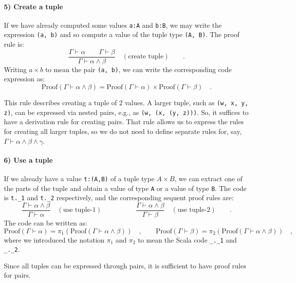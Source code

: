 \paragraph{5) Create a tuple}

If we have already computed some values \lstinline!a:A! and \lstinline!b:B!,
we may write the expression \lstinline!(a, b)! and so compute a value
of the tuple type \lstinline!(A, B)!. The proof rule is:
\[
\frac{\Gamma\vdash\alpha\quad\quad\Gamma\vdash\beta}{\Gamma\vdash\alpha\wedge\beta}\quad(\text{create tuple})\quad\quad.
\]
Writing $a\times b$ to mean the pair \lstinline!(a, b)!, we can
write the corresponding code expression as:
\[
\text{Proof}\left(\Gamma\vdash\alpha\wedge\beta\right)=\text{Proof}\left(\Gamma\vdash\alpha\right)\times\text{Proof}\left(\Gamma\vdash\beta\right)\quad.
\]

This rule describes creating a tuple of $2$ values. A larger tuple,
such as \lstinline!(w, x, y, z)!, can be expressed via nested pairs,
e.g., as \lstinline!(w, (x, (y, z)))!. So, it suffices to have a
derivation rule for creating pairs. That rule allows us to express
the rules for creating all larger tuples, so we do not need to define
separate rules for, say, $\Gamma\vdash\alpha\wedge\beta\wedge\gamma$.

\paragraph{6) Use a tuple}

If we already have a value \lstinline!t:(A,B)! of a tuple type $A\times B$,
we can extract one of the parts of the tuple and obtain a value of
type \lstinline!A! or a value of type \lstinline!B!. The code is
\lstinline!t._1! and \lstinline!t._2! respectively, and the corresponding
sequent proof rules are:
\[
\frac{\Gamma\vdash\alpha\wedge\beta}{\Gamma\vdash\alpha}\quad(\text{use tuple-}1)\quad\quad\quad\quad\quad\frac{\Gamma\vdash\alpha\wedge\beta}{\Gamma\vdash\beta}\quad(\text{use tuple-}2)\quad\quad.
\]
The code can be written as:
\[
\text{Proof}\left(\Gamma\vdash\alpha\right)=\pi_{1}\left(\text{Proof}\left(\Gamma\vdash\alpha\wedge\beta\right)\right)\quad,\quad\quad\text{Proof}\left(\Gamma\vdash\beta\right)=\pi_{2}\left(\text{Proof}\left(\Gamma\vdash\alpha\wedge\beta\right)\right)\quad,
\]
where we introduced the notation $\pi_{1}$ and $\pi_{2}$ to mean
the Scala code \lstinline!_._1! and \lstinline!_._2!.

Since all tuples can be expressed through pairs, it is sufficient
to have proof rules for pairs.

